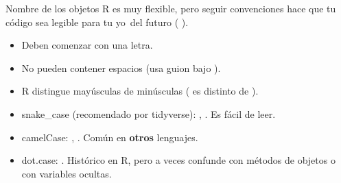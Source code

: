 \documentclass[8pt]{beamer}
\begin{document}
\begin{frame}[fragile]{Nombre de los objetos}
	R es muy flexible, pero seguir convenciones hace que tu código sea legible para tu \guillemetleft yo\guillemetright\ del futuro ( ).
	
	\begin{itemize}
		\item Deben comenzar con una letra.
		\item No pueden contener espacios (usa guion bajo \rscript{_}).
		\item R distingue mayúsculas de minúsculas ( es distinto de ).
	\end{itemize}
	
	\begin{itemize}
		\item snake\_case (recomendado por tidyverse): , . Es fácil de leer.
		\item camelCase: , . Común en \textbf{otros} lenguajes.
		\item dot.case: . Histórico en R, pero a veces confunde con métodos de objetos o con variables ocultas.
	\end{itemize}
\end{frame}
\end{document}
